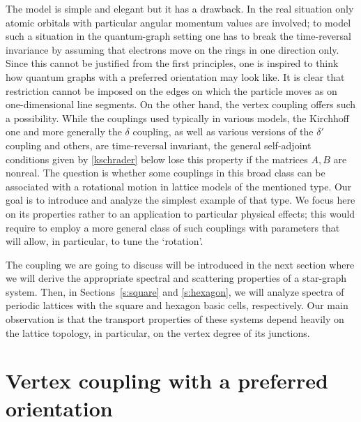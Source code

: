 \documentclass[english]{elsarticle}
\begin{document}
The model is simple and elegant but it has a drawback. In the real situation only atomic orbitals with particular angular momentum values are involved; to model such a situation in the quantum-graph setting one has to break the time-reversal invariance by assuming that electrons move on the rings in one direction only. Since this cannot be justified from the first principles, one is inspired to think how quantum graphs with a preferred orientation may look like. It is clear that restriction cannot be imposed on the edges on which the particle moves as on one-dimensional line segments. On the other hand, the vertex coupling offers such a possibility. While the couplings used typically in various models, the Kirchhoff one and more generally the $\delta$ coupling, as well as various versions of the $\delta'$ coupling and others, are time-reversal invariant, the general self-adjoint conditions given by \eqref{kschrader} below lose this property if the matrices $A,B$ are nonreal. The question is whether some couplings in this broad class can be associated with a rotational motion in lattice models of the mentioned type. Our goal is to introduce and analyze the simplest example of that type. We focus here on its properties rather to an application to particular physical effects; this would require to employ a more general class of such couplings with parameters that will allow, in particular, to tune the `rotation'.

The coupling we are going to discuss will be introduced in the next section where we will derive the appropriate spectral and scattering properties of a star-graph system. Then, in Sections~\ref{s:square} and \ref{s:hexagon}, we will analyze spectra of periodic lattices with the square and hexagon basic cells, respectively. Our main observation is that the transport properties of these systems depend heavily on the lattice topology, in particular, on the vertex degree of its junctions.

\section{Vertex coupling with a preferred orientation} %
\end{document}
